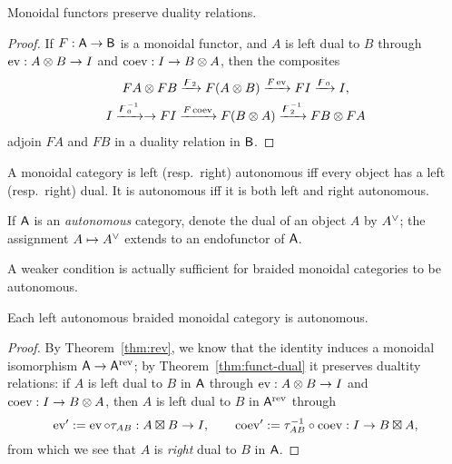 \begin{proposition}
  \label{thm:funct-dual}
  Monoidal functors preserve duality relations.  
\end{proposition}
\begin{proof}
  If $F: \mathsf{A} \to \mathsf{B}$ is a monoidal functor, and $A$ is left dual to $B$
  through $\operatorname{ev}: A\otimes B \to I$ and $\operatorname{coev}: I\to B\otimes A$, then the composites
  \begin{gather*}
      FA\otimes FB \xrightarrow{\digamma_2} F(A\otimes B) \xrightarrow{F\operatorname{ev}} FI
      \xrightarrow{\digamma_0} I, 
      \\
      I \xrightarrow{\digamma_0\sp{-1}}\to FI \xrightarrow{F\operatorname{coev}} F(B\otimes A)
      \xrightarrow{\digamma_2\sp{-1}} FB\otimes FA
  \end{gather*}
  adjoin $FA$ and $FB$ in a duality relation in $\mathsf{B}$.
\end{proof}

\begin{definition}\label{dfn:autonomous-category}
  A monoidal category is left (resp.\ right) autonomous iff every
  object has a left (resp.\ right) dual. It is autonomous iff it is
  both left and right autonomous.
\end{definition}
If $\mathsf{A}$ is an \emph{autonomous} category, denote the dual of an object
$A$ by $\rdl{A}$; the assignment $A \mapsto \rdl{A}$ extends to an
endofunctor of $\mathsf{A}$.

A weaker condition is actually sufficient for braided
monoidal categories to be autonomous.
\begin{proposition}
\label{thm:ev-rev}
  Each left autonomous braided monoidal category is autonomous.  
\end{proposition}
\begin{proof}
  By Theorem~\ref{thm:rev}, we know that the identity induces a monoidal
  isomorphism $\mathsf{A} \to \mathsf{A}\sp{\text{rev}}$; by Theorem~\ref{thm:funct-dual} it preserves
  dualtity relations: if $A$ is left dual to $B$ in $\mathsf{A}$ through $\operatorname{ev}:
  A\otimes B \to I$ and $\operatorname{coev}: I\to B\otimes A$, then $A$ is left dual to $B$ in
  $\mathsf{A}\sp{\text{rev}}$ through
  \begin{equation*}
    \operatorname{ev}' := \operatorname{ev} \circ \tau_{AB} : A\boxtimes B \to I, 
    \qquad
    \operatorname{coev}' := \tau_{AB}\sp{-1} \circ \operatorname{coev} : I \to B\boxtimes A,
  \end{equation*}
  from which we see that $A$ is \emph{right} dual to $B$ in $\mathsf{A}$.
\end{proof}

